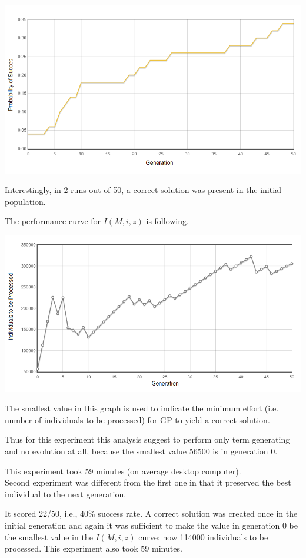 \documentclass[12pt,a4paper]{report}
\begin{document}
\includegraphics[scale=0.65]{reports/ep/report1/probabs.png}

Interestingly, in 2 runs out of 50, a correct solution was present in the initial population.

The performance curve for $I(M,i,z)$ is following.

\includegraphics[scale=0.65]{reports/ep/report1/indivs.png}

The smallest value in this graph is used to indicate the minimum effort
(i.e. number of individuals to be processed) for GP to yield a correct solution.

Thus for this experiment this analysis suggest
to perform only term generating and no evolution at all, 
because the smallest value 56500 is in generation 0.

This experiment took 59 minutes (on average desktop computer).\\

Second experiment was different from the first one in that it 
preserved the best individual to the next generation.

It scored 22/50, i.e., 40\% success rate. A correct solution was
created once in the initial generation and again it was
sufficient to make the value in generation 0
be the smallest value in the $I(M,i,z)$ curve; now 114000
 individuals to be processed.
This experiment also took 59 minutes.\\
\end{document}
